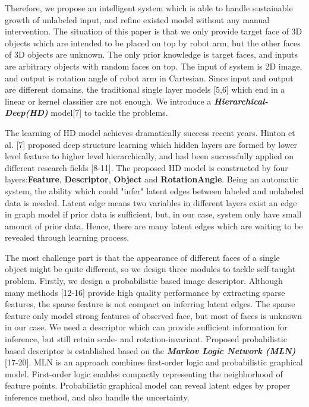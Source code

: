 \documentclass[journal]{IEEEtran}
\begin{document}
Therefore, we propose an intelligent system which is able to handle sustainable growth of unlabeled input, and refine existed model without any manual intervention. The situation of this paper is that we only provide target face of 3D objects which are intended to be placed on top by robot arm, but the other faces of 3D objects are unknown. The only prior knowledge is target faces, and inputs are arbitrary objects with random faces on top. The input of system is 2D image, and output is rotation angle of robot arm in Cartesian. Since input and output are different domains, the traditional single layer models [5,6] which end in a linear or kernel classifier are not enough. We introduce a \textit{\textbf{Hierarchical-Deep(HD)}} model[7] to tackle the problems. 

The learning of HD model achieves dramatically success recent years. Hinton et al. [7] proposed deep structure learning which hidden layers are formed by lower level feature to higher level hierarchically, and had been successfully applied on different research fields [8-11]. The proposed HD model is constructed by four layers:\textbf{Feature}, \textbf{Descriptor}, \textbf{Object} and \textbf{RotationAngle}. Being an automatic system, the ability which could "infer" latent edges between labeled and unlabeled data is needed. Latent edge means two variables in different layers exist an edge in graph model if prior data is sufficient, but, in our case, system only have small amount of prior data. Hence, there are many latent edges which are waiting to be revealed through learning process. 

The most challenge part is that the appearance of different faces of a single object might be quite different, so we design three modules to tackle self-taught problem. Firstly, we design a probabilistic based image descriptor. Although many methods [12-16] provide high quality performance by extracting sparse features, the sparse feature is not compact on inferring latent edges. The sparse feature only model strong features of observed face, but most of faces is unknown in our case. We need a descriptor which can provide sufficient information for inference, but still retain scale- and rotation-invariant. Proposed probabilistic based descriptor is established based on the \textit{\textbf{Markov Logic Network (MLN)}} [17-20]. MLN is an approach combines first-order logic and probabilistic graphical model. First-order logic enables compactly representing the neighborhood of feature points. Probabilistic graphical model can reveal latent edges by proper inference method, and also handle the uncertainty.  
\end{document}
